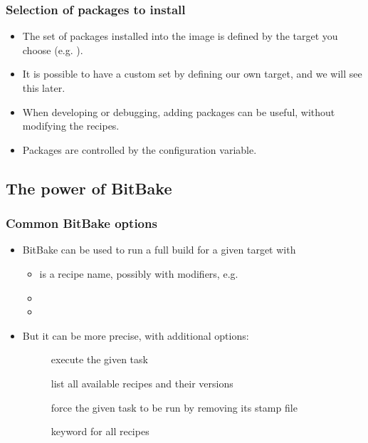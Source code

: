 \begin{frame}
  \frametitle{Selection of packages to install}
  \begin{itemize}
    \item The set of packages installed into the image is defined by
      the target you choose (e.g. ).
    \item It is possible to have a custom set by defining our own
      target, and we will see this later.
    \item When developing or debugging, adding packages can be useful,
      without modifying the recipes.
    \item Packages are controlled by the 
      configuration variable.
  \end{itemize}
\end{frame}

\subsection{The power of BitBake}

\begin{frame}
  \frametitle{Common BitBake options}
  \begin{itemize}
    \item BitBake can be used to run a full build for a given target
      with 
    \begin{itemize}
      \item {} is a recipe name, possibly with modifiers,
        e.g. 
      \item {}
      \item {}
    \end{itemize}
    \item But it can be more precise, with additional options:
    \begin{description}
      \item[] execute the given task
      \item[] list all available recipes and their
        versions
      \item[] force the given task to be run by removing its
        stamp file
      \item[] keyword for all recipes
    \end{description}
  \end{itemize}
\end{frame}

